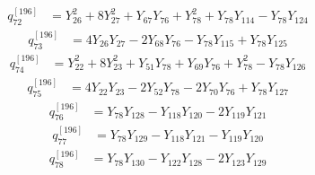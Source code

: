 \begin{equation}\label{q196:row:072}
\begin{aligned}
q_{72}^{[196]} &={} Y_{26}^{2} + 8Y_{27}^{2} + Y_{67}Y_{76} + Y_{78}^{2} + Y_{78}Y_{114} - Y_{78}Y_{124}
\end{aligned}
\end{equation}
\begin{equation}\label{q196:row:073}
\begin{aligned}
q_{73}^{[196]} &={} 4Y_{26}Y_{27} - 2Y_{68}Y_{76} - Y_{78}Y_{115} + Y_{78}Y_{125}
\end{aligned}
\end{equation}
\begin{equation}\label{q196:row:074}
\begin{aligned}
q_{74}^{[196]} &={} Y_{22}^{2} + 8Y_{23}^{2} + Y_{51}Y_{78} + Y_{69}Y_{76} + Y_{78}^{2} - Y_{78}Y_{126}
\end{aligned}
\end{equation}
\begin{equation}\label{q196:row:075}
\begin{aligned}
q_{75}^{[196]} &={} 4Y_{22}Y_{23} - 2Y_{52}Y_{78} - 2Y_{70}Y_{76} + Y_{78}Y_{127}
\end{aligned}
\end{equation}
\begin{equation}\label{q196:row:076}
\begin{aligned}
q_{76}^{[196]} &={} Y_{78}Y_{128} - Y_{118}Y_{120} - 2Y_{119}Y_{121}
\end{aligned}
\end{equation}
\begin{equation}\label{q196:row:077}
\begin{aligned}
q_{77}^{[196]} &={} Y_{78}Y_{129} - Y_{118}Y_{121} - Y_{119}Y_{120}
\end{aligned}
\end{equation}
\begin{equation}\label{q196:row:078}
\begin{aligned}
q_{78}^{[196]} &={} Y_{78}Y_{130} - Y_{122}Y_{128} - 2Y_{123}Y_{129}
\end{aligned}
\end{equation}
